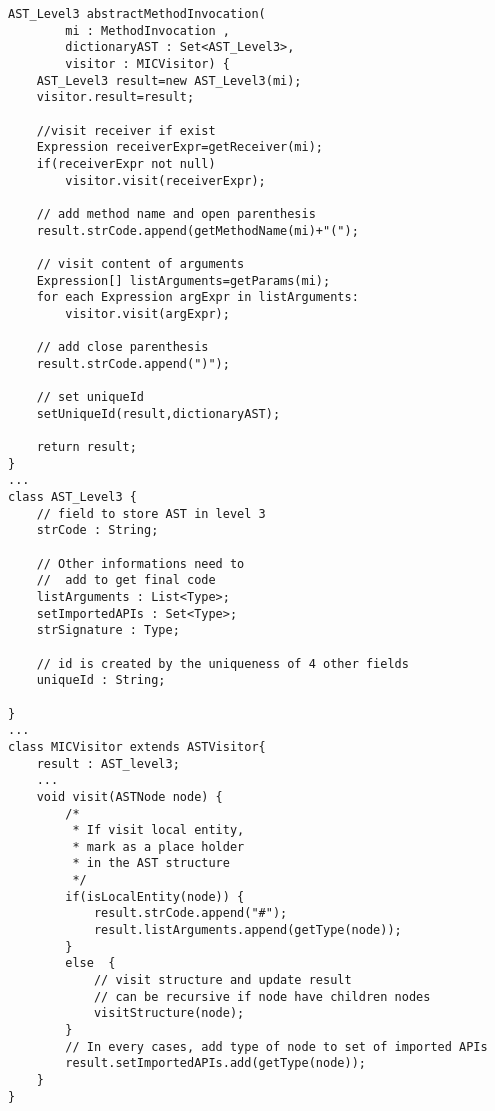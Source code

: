 \begin{lstlisting}[basicstyle=\tiny,caption={Algorithm for Method Invocation Abstraction},label={lt:AlgorithmMethodAbstractor}]
AST_Level3 abstractMethodInvocation(
		mi : MethodInvocation ,
		dictionaryAST : Set<AST_Level3>,
		visitor : MICVisitor) {
	AST_Level3 result=new AST_Level3(mi);		
	visitor.result=result;
	
	//visit receiver if exist
	Expression receiverExpr=getReceiver(mi);		
	if(receiverExpr not null)
		visitor.visit(receiverExpr);
	
	// add method name and open parenthesis
	result.strCode.append(getMethodName(mi)+"(");
	
	// visit content of arguments
	Expression[] listArguments=getParams(mi);		
	for each Expression argExpr in listArguments:
		visitor.visit(argExpr);
	
	// add close parenthesis
	result.strCode.append(")");

	// set uniqueId
	setUniqueId(result,dictionaryAST);
	
	return result;		
}
...
class AST_Level3 {
	// field to store AST in level 3
	strCode : String;

	// Other informations need to 
	//	add to get final code
	listArguments : List<Type>;
	setImportedAPIs : Set<Type>;	
	strSignature : Type;

	// id is created by the uniqueness of 4 other fields 
	uniqueId : String;
	
}
...
class MICVisitor extends ASTVisitor{
	result : AST_level3;
	...		
	void visit(ASTNode node) {
		/*
		 * If visit local entity,
		 * mark as a place holder
		 * in the AST structure
		 */
		if(isLocalEntity(node)) {
			result.strCode.append("#");
			result.listArguments.append(getType(node));				
		} 
		else  {	
			// visit structure and update result
			// can be recursive if node have children nodes
			visitStructure(node);
		} 			
		// In every cases, add type of node to set of imported APIs
		result.setImportedAPIs.add(getType(node));		
	}	
}
\end{lstlisting}